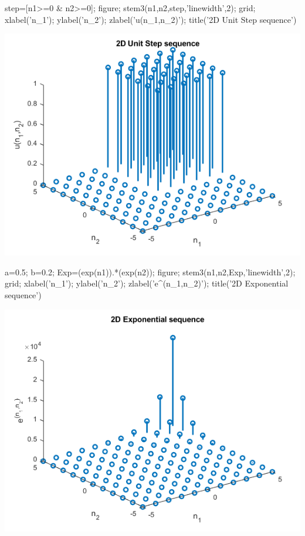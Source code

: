 \documentclass[12pt, onecolumn]{IEEEtran}
\begin{document}

\begin{matlabcode}
step=[n1>=0 & n2>=0]; figure; stem3(n1,n2,step,'linewidth',2); grid; %
xlabel('n_1'); ylabel('n_2'); zlabel('u(n_1,n_2)'); title('2D Unit Step sequence')
\end{matlabcode}
\begin{center}
\includegraphics[width=\maxwidth{56.196688409433015em}]{figure_3.png}
\end{center}


\begin{matlabcode}
a=0.5; b=0.2;
Exp=(exp(n1)).*(exp(n2)); figure; stem3(n1,n2,Exp,'linewidth',2); grid; %
xlabel('n_1'); ylabel('n_2'); zlabel('e^{(n_1,n_2)}'); title('2D Exponential sequence')
\end{matlabcode}
\begin{center}
\includegraphics[width=\maxwidth{56.196688409433015em}]{figure_4.png}
\end{center}
\end{document}
